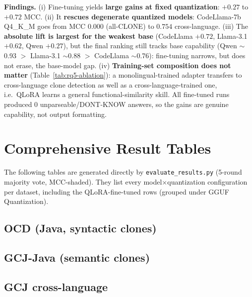 \documentclass[11pt]{article}
\begin{document}
\noindent\textbf{Findings.} (i) Fine-tuning yields \textbf{large gains at fixed
quantization}: $+0.27$ to $+0.72$ MCC. (ii) It \textbf{rescues degenerate
quantized models}: CodeLlama-7b Q4\_K\_M goes from MCC $0.000$ (all-CLONE) to
$0.754$ cross-language. (iii) The \textbf{absolute lift is largest for the
weakest base} (CodeLlama $+0.72$, Llama-3.1 $+0.62$, Qwen $+0.27$), but the
final ranking still tracks base capability (Qwen $\sim$0.93 $>$ Llama-3.1
$\sim$0.88 $>$ CodeLlama $\sim$0.76): fine-tuning narrows, but does not erase,
the base-model gap. (iv) \textbf{Training-set composition does not matter}
(Table~\ref{tab:rq5-ablation}): a monolingual-trained adapter transfers to
cross-language clone detection as well as a cross-language-trained one, i.e.\
QLoRA learns a general functional-similarity skill. All fine-tuned runs produced
0 unparseable/DONT-KNOW answers, so the gains are genuine capability, not output
formatting.

\section{Comprehensive Result Tables}
\label{sec:fulltables}
The following tables are generated directly by \texttt{evaluate_results.py}
(5-round majority vote, MCC-shaded). They list every model$\times$quantization
configuration per dataset, including the QLoRA-fine-tuned rows (grouped under
GGUF Quantization).

\subsection{OCD (Java, syntactic clones)}


\subsection{GCJ-Java (semantic clones)}


\subsection{GCJ cross-language}

\end{document}
